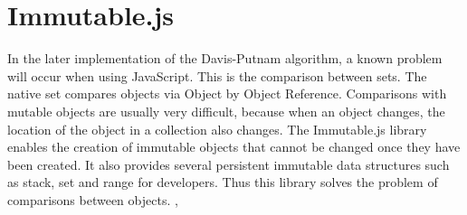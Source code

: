 \section{Immutable.js}
\label{sec:tecImmutable}
In the later implementation of the Davis-Putnam algorithm, a known problem will occur when using JavaScript. This is the comparison between sets. The native set compares objects via Object by Object Reference. Comparisons with mutable objects are usually very difficult, because when an object changes, the location of the object in a collection also changes. The Immutable.js library enables the creation of immutable objects that cannot be changed once they have been created. It also provides several persistent immutable data structures such as stack, set and range for developers. Thus this library solves the problem of comparisons between objects. \cite{Immutable.jsAuthors2019}, \cite{Rauschmayer2015}

